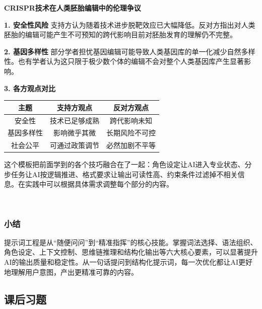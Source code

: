 \begin{aibox}
\textbf{CRISPR技术在人类胚胎编辑中的伦理争议}

\textbf{1. 安全性风险}
支持方认为随着技术进步脱靶效应已大幅降低。反对方指出对人类胚胎的编辑可能产生不可预知的跨代影响目前对胚胎发育的理解仍不完整。

\textbf{2. 基因多样性}
部分学者担忧基因编辑可能导致人类基因库的单一化减少自然多样性。也有学者认为这只限于极少数个体的编辑不会对整个人类基因库产生显著影响。

\textbf{3. 各方观点对比}
\begin{formalTable}[H]
\caption{基因编辑各方观点对比}
\label{tab:ch3_03_debate}
\begin{tabular}{c c c}
\toprule
主题 & 支持方观点 & 反对方观点 \\ \midrule
安全性 & 技术已足够成熟 & 跨代影响未知 \\
基因多样性 & 影响微乎其微 & 长期风险不可控 \\
社会公平 & 可通过政策调节 & 必然加剧不平等 \\ \bottomrule
\end{tabular}
\end{formalTable}

\end{aibox}

这个模板把前面学到的各个技巧融合在了一起：角色设定让AI进入专业状态、分步任务让AI按逻辑推进、格式要求让输出可读性高、约束条件过滤掉不相关信息。在实践中可以根据具体需求调整每个部分的内容。

\begin{center}
\textcolor{gray!70}{\*\ \ \*\ \ \*}
\end{center}
\vspace{12pt}



\subsubsection*{小结}

提示词工程是从“随便问问”到“精准指挥”的核心技能。掌握词法选择、语法组织、角色设定、上下文控制、思维链推理和结构化输出等六大核心要素，可以显著提升AI的输出质量和稳定性。从一句话提问到结构化提示词，每一次优化都让AI更好地理解用户意图，产出更精准可靠的内容。

\bigskip
\subsection*{课后习题}

